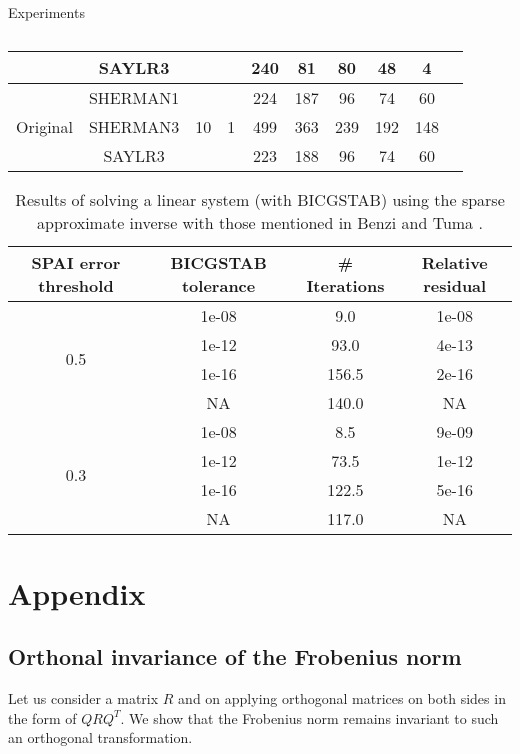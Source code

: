 \documentclass[paper=A4, fontsize=11pt]{scrartcl}
\theoremstyle{remark}
\begin{document}
\begin{section}{Experiments}
\begin{table}[]
\begin{tabular}{@{}lc|cc|cccccc@{}}
	& SAYLR3 & & & 240 & 81 & 80 & 48 & 4  \\
		\midrule
	\multirow{3}{*}{Original} & SHERMAN1 & \multirow{3}{*}{10} & \multirow{3}{*}{1} & 224 & 187 & 96 & 74 & 60  \\

& SHERMAN3 &  &  & 499 & 363 & 239 & 192 & 148  \\

& SAYLR3 & & & 223 & 188 & 96 & 74 & 60  \\
	\bottomrule
	\end{tabular}
	\caption{}
\label{tab:chow}
\end{table}
\begin{table}[]
	\centering
	\begin{tabular}{@{}cccc@{}}
		\toprule
		SPAI error threshold & BICGSTAB tolerance & \# Iterations & Relative residual  \\ \midrule
		\multirow{4}{*}{0.5}& 1e-08 & 9.0 & 1e-08 \\
			& 1e-12 & 93.0 & 4e-13 \\
			& 1e-16 & 156.5 & 2e-16 \\
			(original)			& NA & 140.0 & NA \\
		\midrule
		\multirow{4}{*}{0.3} & 1e-08	& 8.5	& 9e-09 \\
		& 1e-12	& 73.5	& 1e-12 \\
		& 1e-16	& 122.5	& 5e-16 \\
			(original)					& NA & 117.0 & NA \\
		\bottomrule
	\end{tabular}
	\caption{Results of solving a linear system (with BICGSTAB) using the sparse approximate inverse with those mentioned in Benzi and Tuma \cite{benzi}.}
	\label{tab:benzi}
\end{table}

\end{section}

\clearpage



\section{Appendix}

\subsection{Orthonal invariance of the Frobenius norm}\label{sec:ortho}
Let us consider a matrix $R$ and on applying orthogonal matrices on both sides in the form of $QRQ^{T}$. We show that the Frobenius norm remains invariant to such an orthogonal transformation. \\
\end{document}
